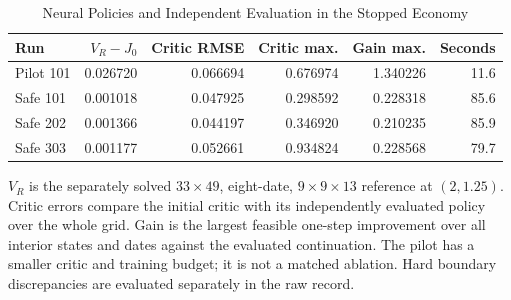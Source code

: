 \begin{table}[tbp]
\centering
\caption{Neural Policies and Independent Evaluation in the Stopped Economy}
\label{tab:ndu_neural}
\small
\begin{tabular}{@{}lrrrrr@{}}
\toprule
Run & $V_R-J_0$ & Critic RMSE & Critic max. & Gain max. & Seconds \\
\midrule
Pilot 101 & 0.026720 & 0.066694 & 0.676974 & 1.340226 & 11.6 \\
Safe 101 & 0.001018 & 0.047925 & 0.298592 & 0.228318 & 85.6 \\
Safe 202 & 0.001366 & 0.044197 & 0.346920 & 0.210235 & 85.9 \\
Safe 303 & 0.001177 & 0.052661 & 0.934824 & 0.228568 & 79.7 \\
\bottomrule
\end{tabular}
\par\smallskip\begin{minipage}{\linewidth}\footnotesize $V_R$ is the separately solved $33\times49$, eight-date, $9\times9\times13$ reference at $(2,1.25)$. Critic errors compare the initial critic with its independently evaluated policy over the whole grid. Gain is the largest feasible one-step improvement over all interior states and dates against the evaluated continuation. The pilot has a smaller critic and training budget; it is not a matched ablation. Hard boundary discrepancies are evaluated separately in the raw record.\end{minipage}
\end{table}
